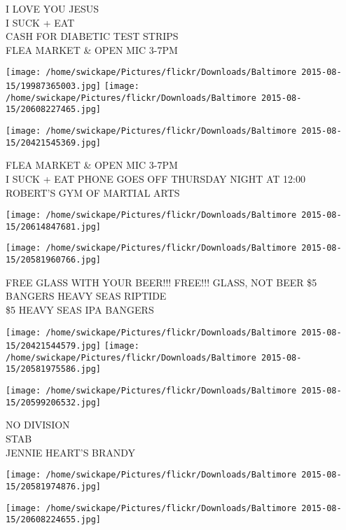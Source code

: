 \documentclass[10pt,letterpaper]{article}
\begin{document}
I LOVE YOU JESUS\\
I SUCK + EAT\\
CASH FOR DIABETIC TEST STRIPS\\
FLEA MARKET \& OPEN MIC 3{-}7PM\\
\pagebreak

\texttt{[image: /home/swickape/Pictures/flickr/Downloads/Baltimore 2015-08-15/19987365003.jpg]}
\texttt{[image: /home/swickape/Pictures/flickr/Downloads/Baltimore 2015-08-15/20608227465.jpg]}

\vspace{0.25in}
\texttt{[image: /home/swickape/Pictures/flickr/Downloads/Baltimore 2015-08-15/20421545369.jpg]}

FLEA MARKET \& OPEN MIC 3{-}7PM\\
I SUCK + EAT PHONE GOES OFF THURSDAY NIGHT AT 12:00\\
ROBERT'S GYM OF MARTIAL ARTS\\
\pagebreak

\texttt{[image: /home/swickape/Pictures/flickr/Downloads/Baltimore 2015-08-15/20614847681.jpg]}

\vspace{0.25in}
\texttt{[image: /home/swickape/Pictures/flickr/Downloads/Baltimore 2015-08-15/20581960766.jpg]}

FREE GLASS WITH YOUR BEER!!! FREE!!! GLASS, NOT BEER \$5 BANGERS HEAVY SEAS RIPTIDE\\
\$5 HEAVY SEAS IPA BANGERS\\
\pagebreak

\texttt{[image: /home/swickape/Pictures/flickr/Downloads/Baltimore 2015-08-15/20421544579.jpg]}
\texttt{[image: /home/swickape/Pictures/flickr/Downloads/Baltimore 2015-08-15/20581975586.jpg]}

\vspace{0.25in}
\texttt{[image: /home/swickape/Pictures/flickr/Downloads/Baltimore 2015-08-15/20599206532.jpg]}

NO DIVISION\\
STAB\\
JENNIE HEART'S BRANDY\\
\pagebreak

\texttt{[image: /home/swickape/Pictures/flickr/Downloads/Baltimore 2015-08-15/20581974876.jpg]}

\vspace{0.25in}
\texttt{[image: /home/swickape/Pictures/flickr/Downloads/Baltimore 2015-08-15/20608224655.jpg]}
\end{document}
